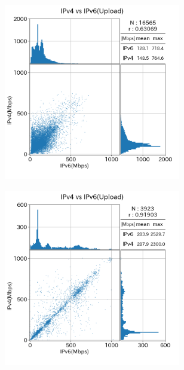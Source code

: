\begin{figure}[htbp]
\begin{center}
\begin{minipage}[t]{0.48\textwidth}
\begin{center}
\begin{subfigure}[b]{\textwidth}
                    \includegraphics[width=0.85\textwidth]{fig/new_NTT_ul.png}
                    \label{new_NTT_ul}
                \end{subfigure}
                \begin{subfigure}[b]{\textwidth}
                    \centering
                    \includegraphics[width=0.85\textwidth]{fig/new_KDDI_ul.png}
                    \label{new_KDDI_ul}

\end{subfigure}
\end{center}
\end{minipage}
\end{center}
\end{figure}
